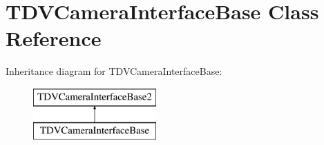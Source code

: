 \hypertarget{classTDVCameraInterfaceBase}{
\section{TDVCameraInterfaceBase Class Reference}
\label{classTDVCameraInterfaceBase}
}
Inheritance diagram for TDVCameraInterfaceBase:\begin{figure}[H]
\begin{center}
\leavevmode
\includegraphics[height=2cm]{classTDVCameraInterfaceBase}
\end{center}
\end{figure}

